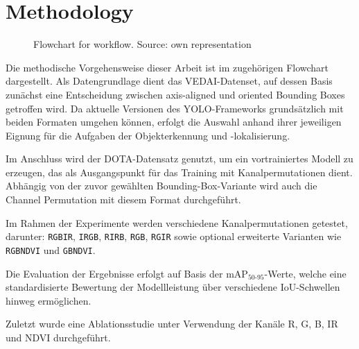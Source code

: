 \chapter{Methodology}
\label{ch:methodology}
\begin{figure}[htbp]
    \centering
    
    \caption{Flowchart for workflow. Source: own representation}
    \label{fig:Flowchart}
\end{figure}
Die methodische Vorgehensweise dieser Arbeit ist im zugehörigen Flowchart dargestellt. Als Datengrundlage dient das VEDAI-Datenset, auf dessen Basis zunächst eine Entscheidung zwischen axis-aligned und oriented Bounding Boxes getroffen wird. Da aktuelle Versionen des YOLO-Frameworks grundsätzlich mit beiden Formaten umgehen können, erfolgt die Auswahl anhand ihrer jeweiligen Eignung für die Aufgaben der Objekterkennung und -lokalisierung.

Im Anschluss wird der DOTA-Datensatz genutzt, um ein vortrainiertes Modell zu erzeugen, das als Ausgangspunkt für das Training mit Kanalpermutationen dient. Abhängig von der zuvor gewählten Bounding-Box-Variante wird auch die Channel Permutation mit diesem Format durchgeführt.

Im Rahmen der Experimente werden verschiedene Kanalpermutationen getestet, darunter: \texttt{RGBIR}, \texttt{IRGB}, \texttt{RIRB}, \texttt{RGB}, \texttt{RGIR} sowie optional erweiterte Varianten wie \texttt{RGBNDVI} und \texttt{GBNDVI}.

Die Evaluation der Ergebnisse erfolgt auf Basis der mAP$_{50\text{-}95}$-Werte, welche eine standardisierte Bewertung der Modellleistung über verschiedene IoU-Schwellen hinweg ermöglichen. 

Zuletzt wurde eine Ablationsstudie unter Verwendung der Kanäle R, G, B, IR und NDVI durchgeführt.





